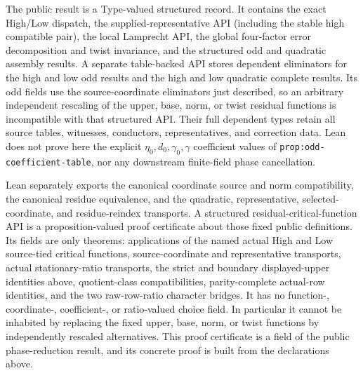 \begin{definition}
The public result is a Type-valued structured record.  It contains the exact
High/Low dispatch, the supplied-representative API (including the stable high
compatible pair), the local Lamprecht API, the global four-factor error
decomposition and twist invariance, and the structured odd and quadratic
assembly results.  A separate table-backed API stores dependent eliminators
for the high and low odd results and the high and low quadratic complete
results.  Its odd fields use the source-coordinate eliminators just
described, so an arbitrary independent rescaling of the upper, base, norm,
or twist residual functions is incompatible with that structured API.
Their full dependent types retain all source tables, witnesses, conductors,
representatives, and correction data.  Lean does not prove here the explicit
$\eta_0,d_0,\gamma_0,\gamma$ coefficient values of
\texttt{prop:odd-coefficient-table}, nor any downstream finite-field phase
cancellation.

Lean separately exports the canonical coordinate source and norm
compatibility, the canonical residue equivalence, and the quadratic,
representative, selected-coordinate, and residue-reindex transports.  A
structured residual-critical-function API is a proposition-valued proof
certificate about those fixed public definitions.  Its fields are only
theorems: applications of the named actual High and Low source-tied critical
functions, source-coordinate and representative transports, actual
stationary-ratio transports, the strict and boundary displayed-upper
identities above, quotient-class compatibilities, parity-complete actual-row
identities, and the two raw-row-ratio character bridges.  It has no function-, coordinate-,
coefficient-, or ratio-valued choice field.  In particular it cannot be
inhabited by replacing the fixed upper, base, norm, or twist functions by
independently rescaled alternatives.  This proof certificate is a field of
the public phase-reduction result, and its concrete proof is built from the
declarations above.


\end{definition}
